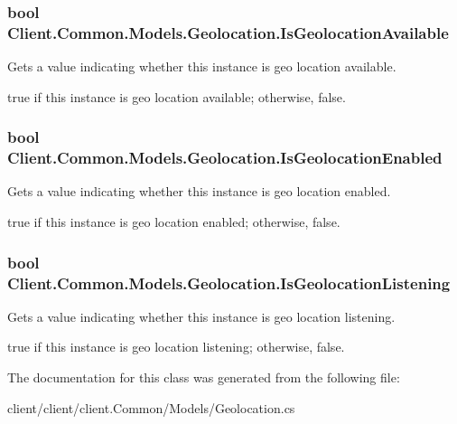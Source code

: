 \subsubsection[{Is\+Geolocation\+Available}]{\setlength{\rightskip}{0pt plus 5cm}bool Client.\+Common.\+Models.\+Geolocation.\+Is\+Geolocation\+Available\hspace{0.3cm}{\ttfamily [get]}}\label{classClient_1_1Common_1_1Models_1_1Geolocation_ac61d7c4a25a8a8a3db55177ec8f0fb40}


Gets a value indicating whether this instance is geo location available. 

{\ttfamily true} if this instance is geo location available; otherwise, {\ttfamily false}.\hypertarget{classClient_1_1Common_1_1Models_1_1Geolocation_a4d17b1f0ad9cb37ed4d67097266ef214}{}
\subsubsection[{Is\+Geolocation\+Enabled}]{\setlength{\rightskip}{0pt plus 5cm}bool Client.\+Common.\+Models.\+Geolocation.\+Is\+Geolocation\+Enabled\hspace{0.3cm}{\ttfamily [get]}}\label{classClient_1_1Common_1_1Models_1_1Geolocation_a4d17b1f0ad9cb37ed4d67097266ef214}


Gets a value indicating whether this instance is geo location enabled. 

{\ttfamily true} if this instance is geo location enabled; otherwise, {\ttfamily false}.\hypertarget{classClient_1_1Common_1_1Models_1_1Geolocation_a1d0e7e5bfd5ae8c366169c4c4a1d1747}{}
\subsubsection[{Is\+Geolocation\+Listening}]{\setlength{\rightskip}{0pt plus 5cm}bool Client.\+Common.\+Models.\+Geolocation.\+Is\+Geolocation\+Listening\hspace{0.3cm}{\ttfamily [get]}}\label{classClient_1_1Common_1_1Models_1_1Geolocation_a1d0e7e5bfd5ae8c366169c4c4a1d1747}


Gets a value indicating whether this instance is geo location listening. 

{\ttfamily true} if this instance is geo location listening; otherwise, {\ttfamily false}.

The documentation for this class was generated from the following file\+:\begin{DoxyCompactItemize}
\item 
client/client/client.\+Common/\+Models/Geolocation.\+cs\end{DoxyCompactItemize}
